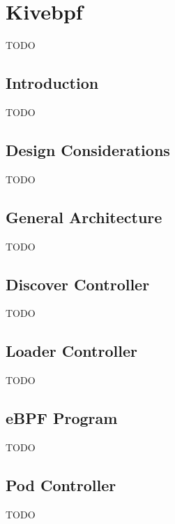 \chapter{Kivebpf}

TODO

\section{Introduction}

TODO

\section{Design Considerations}

TODO

\section{General Architecture}

TODO

\section{Discover Controller}

TODO

\section{Loader Controller}

TODO

\section{eBPF Program}

TODO

\section{Pod Controller}

TODO
